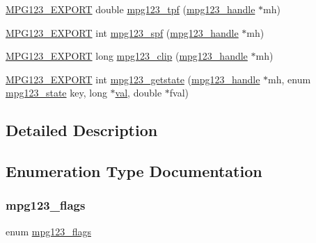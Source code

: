 \begin{DoxyCompactItemize}
\mbox{\hyperlink{mpg123_8h_a2ba98cfba3f760879df70e755b2a61cc}{M\+P\+G123\+\_\+\+E\+X\+P\+O\+RT}} double \mbox{\hyperlink{group__mpg123__status_ga6edf9556db430445dac2434ed5306a12}{mpg123\+\_\+tpf}} (\mbox{\hyperlink{group__mpg123__init_ga6728e2839a395f3a07d4514da659faca}{mpg123\+\_\+handle}} $\ast$mh)
\item 
\mbox{\hyperlink{mpg123_8h_a2ba98cfba3f760879df70e755b2a61cc}{M\+P\+G123\+\_\+\+E\+X\+P\+O\+RT}} int \mbox{\hyperlink{group__mpg123__status_ga361e1b936b6dca126ba46e06e06fcc53}{mpg123\+\_\+spf}} (\mbox{\hyperlink{group__mpg123__init_ga6728e2839a395f3a07d4514da659faca}{mpg123\+\_\+handle}} $\ast$mh)
\item 
\mbox{\hyperlink{mpg123_8h_a2ba98cfba3f760879df70e755b2a61cc}{M\+P\+G123\+\_\+\+E\+X\+P\+O\+RT}} long \mbox{\hyperlink{group__mpg123__status_gadb294b6e7c73dc58190b6fa2f024042d}{mpg123\+\_\+clip}} (\mbox{\hyperlink{group__mpg123__init_ga6728e2839a395f3a07d4514da659faca}{mpg123\+\_\+handle}} $\ast$mh)
\item 
\mbox{\hyperlink{mpg123_8h_a2ba98cfba3f760879df70e755b2a61cc}{M\+P\+G123\+\_\+\+E\+X\+P\+O\+RT}} int \mbox{\hyperlink{group__mpg123__status_gaf8d11409b86657b19069bbffb4c22fb7}{mpg123\+\_\+getstate}} (\mbox{\hyperlink{group__mpg123__init_ga6728e2839a395f3a07d4514da659faca}{mpg123\+\_\+handle}} $\ast$mh, enum \mbox{\hyperlink{group__mpg123__status_gadfc90f3072f8c1fe32dd88854f6afb28}{mpg123\+\_\+state}} key, long $\ast$\mbox{\hyperlink{_s_d_l__opengl__glext_8h_a26942fd2ed566ef553eae82d2c109c8f}{val}}, double $\ast$fval)
\end{DoxyCompactItemize}


\subsection{Detailed Description}


\subsection{Enumeration Type Documentation}
\mbox{\label{group__mpg123__status_gaf527c5a99203cb8591b0e0dfb2615303}} 
\subsubsection{\texorpdfstring{mpg123\_flags}{mpg123\_flags}}
{\footnotesize\ttfamily enum \mbox{\hyperlink{group__mpg123__status_gaf527c5a99203cb8591b0e0dfb2615303}{mpg123\+\_\+flags}}}

